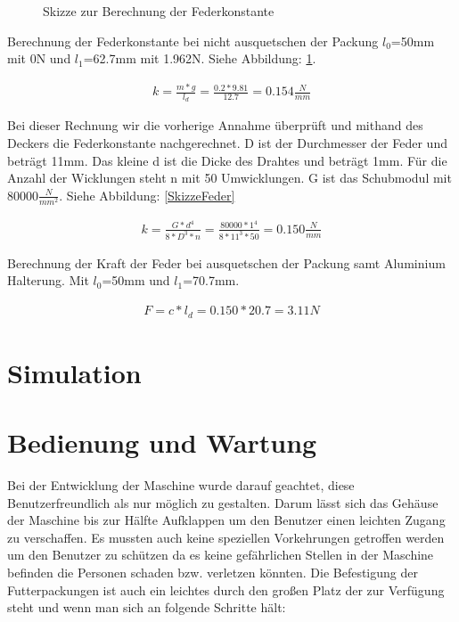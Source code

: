 \begin{figure}[H]
\begin{minipage}[hbt]{.4\linewidth}
      \caption{Skizze zur Berechnung der Federkonstante}
      \label{SkizzeFederkonstante}
   \end{minipage}
\end{figure}

Berechnung der Federkonstante bei nicht ausquetschen der Packung $l_0$=50mm mit 0N und $l_1$=62.7mm mit 1.962N. Siehe Abbildung: \ref{SkizzeFederkonstante}.

\begin{align*}
k =\frac{m*g}{l_d} = \frac{0.2*9.81}{12.7} = 0.154\frac{N}{mm}
\end{align*}

Bei dieser Rechnung wir die vorherige Annahme überprüft und mithand des Deckers die Federkonstante nachgerechnet. D ist der Durchmesser der Feder und beträgt 11mm. Das kleine d ist die Dicke des Drahtes und beträgt 1mm. Für die Anzahl der Wicklungen steht n mit 50 Umwicklungen. G ist das Schubmodul mit 80000$\frac{N}{mm^{2}}$. Siehe Abbildung: \ref{SkizzeFeder}

\begin{align*}
k=\frac{G*d^{4}}{8*D^{3}*n}=\frac{80000*1^{4}}{8*11^{3}*50} = 0.150\frac{N}{mm}
\end{align*}

Berechnung der Kraft der Feder bei ausquetschen der Packung samt Aluminium Halterung. Mit $l_0$=50mm und $l_1$=70.7mm.

\begin{align*}
F=c*l_d=0.150*20.7 = 3.11N
\end{align*}

\section{Simulation}

	
\section{Bedienung und Wartung}

Bei der Entwicklung der Maschine wurde darauf geachtet, diese Benutzerfreundlich als nur möglich zu gestalten. Darum lässt sich das Gehäuse der Maschine bis zur Hälfte Aufklappen um den Benutzer einen leichten Zugang zu verschaffen. Es mussten auch keine speziellen Vorkehrungen getroffen werden um den Benutzer zu schützen da es keine gefährlichen Stellen in der Maschine befinden die Personen schaden bzw. verletzen könnten. Die Befestigung der Futterpackungen ist auch ein leichtes durch den großen Platz der zur Verfügung steht und wenn man sich an folgende Schritte hält: 

